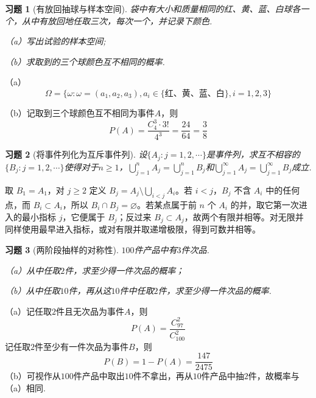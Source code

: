 \documentclass[12pt,fontset=fandol]{ctexart}
\newtheorem{exercise}{习题}[section]
\begin{document}
\begin{exercise}[有放回抽球与样本空间]\label{q:Y1.3}
袋中有大小和质量相同的红、黄、蓝、白球各一个，从中有放回地任取三次，每次一个，并记录下颜色.

（a）写出试验的样本空间;

（b）求取到的三个球颜色互不相同的概率.\par{}
\end{exercise}

\begin{solve}\label{a:Y1.3}
（a）
\[\Omega  = \{ \omega :\omega  = ({a_1},{a_2},{a_3}),{a_i} \in \{\text{红、黄、蓝、白} \} ,i = 1,2,3\} \]

（b）记取到三个球颜色互不相同为事件$A$，则
\[P(A) = \frac{{C_4^3}\cdot 3!}{{{4^3}}} = \frac{{24}}{{64}} = \frac{3}{8}\]
\end{solve}

\begin{exercise}[将事件列化为互斥事件列]\label{q:Y1.4}
设$\{A_j:j=1,2,\cdots\}$是事件列，求互不相容的$\{B_j:j=1,2,\cdots\}$使得对于$n\geqslant 1$，$\bigcup\limits_{j = 1}^n {{A_j}}  = \bigcup\limits_{j = 1}^n {{B_j}} $和$\bigcup\limits_{j = 1}^\infty  {{A_j}}  = \bigcup\limits_{j = 1}^\infty  {{B_j}} $成立.\par{}
\end{exercise}

\begin{solve}\label{a:Y1.4}取 $B_1=A_1$，对 $j\ge2$ 定义 $B_j=A_j\setminus\bigcup_{i<j}A_i$。若 $i<j$，$B_j$ 不含 $A_i$ 中的任何点，而 $B_i\subset A_i$，所以 $B_i\cap B_j=\varnothing$。若某点属于前 $n$ 个 $A_i$ 的并，取它第一次进入的最小指标 $j$，它便属于 $B_j$；反过来 $B_j\subset A_j$，故两个有限并相等。对无限并同样使用最早进入指标，或对有限并取递增极限，得到可数并相等。\end{solve}

\begin{exercise}[两阶段抽样的对称性]\label{q:Y1.5}
$100$件产品中有$3$件次品.

（a）从中任取$2$件，求至少得一件次品的概率；

（b）从中任取$10$件，再从这$10$件中任取$2$件，求至少得一件次品的概率.\par{}
\end{exercise}

\begin{solve}\label{a:Y1.5}
（a）记任取$2$件且无次品为事件$A$，则
\[P(A) = \frac{{C_{97}^2}}{{C_{100}^2}} \]
记任取$2$件至少有一件次品为事件$B$，则
\[
P(B)=1-P(A)=\frac{147}{2475}
\]
（b）可视作从$100$件产品中取出$10$件不拿出，再从$10$件产品中抽$2$件，故概率与（a）相同.
\end{solve}
\end{document}
